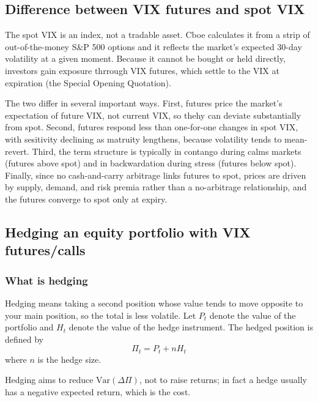 
\subsection{Difference between VIX futures and spot VIX}
The spot VIX is an index, not a tradable asset. Cboe calculates it from a strip of out-of-the-money S\&P 500 options and it reflects the market's expected 30-day volatility at a given moment. Because it cannot be bought or held directly, investors gain exposure thrrough VIX futures, which settle to the VIX at expiration (the Special Opening Quotation).

The two differ in several important ways. First, futures price the market's expectation of future VIX, not current VIX, so thehy can deviate substantially from spot. Second, futures respond less than one-for-one changes in spot VIX, with sesitivity declining as matruity lengthens, because volatility tends to mean-revert. Third, the term structure is typically in contango during calms markets (futures above spot) and in backwardation during stress (futures below spot). Finally, since no cash-and-carry arbitrage links futures to spot, prices are driven by supply, demand, and risk premia rather than a no-arbitrage relationship, and the futures converge to spot only at expiry.

\subsection{Hedging an equity portfolio with VIX futures/calls}
\subsubsection{What is hedging}
Hedging means taking a second position whose value tends to move opposite to your main position, so the total is less volatile. Let $P_t$ denote the value of the portfolio and $H_t$ denote the value of the hedge instrument. The hedged position is defined by
\[
    \Pi_t = P_t + n H_t
\]
where $n$ is the hedge size.

Hedging aims to reduce $\mathrm{Var}(\Delta \Pi)$, not to raise returns; in fact a hedge usually has a negative expected return, which is the cost.

